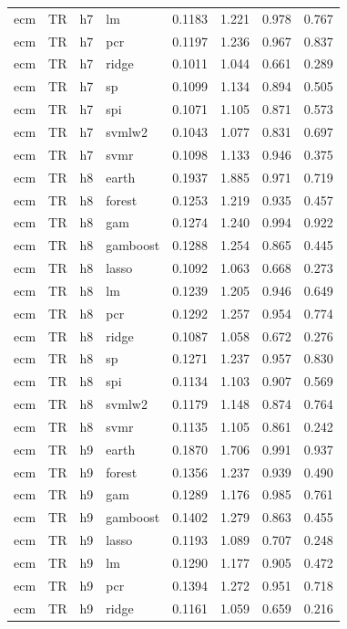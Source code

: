 \begin{ThreePartTable}
\begin{longtable}[t]{llclcccc}
ecm & TR & h7 & lm & 0.1183 & 1.221 & 0.978 & 0.767\\
ecm & TR & h7 & pcr & 0.1197 & 1.236 & 0.967 & 0.837\\
ecm & TR & h7 & ridge & 0.1011 & 1.044 & 0.661 & 0.289\\
ecm & TR & h7 & sp & 0.1099 & 1.134 & 0.894 & 0.505\\
ecm & TR & h7 & spi & 0.1071 & 1.105 & 0.871 & 0.573\\
ecm & TR & h7 & svmlw2 & 0.1043 & 1.077 & 0.831 & 0.697\\
ecm & TR & h7 & svmr & 0.1098 & 1.133 & 0.946 & 0.375\\
\addlinespace
ecm & TR & h8 & earth & 0.1937 & 1.885 & 0.971 & 0.719\\
ecm & TR & h8 & forest & 0.1253 & 1.219 & 0.935 & 0.457\\
ecm & TR & h8 & gam & 0.1274 & 1.240 & 0.994 & 0.922\\
ecm & TR & h8 & gamboost & 0.1288 & 1.254 & 0.865 & 0.445\\
ecm & TR & h8 & lasso & 0.1092 & 1.063 & 0.668 & 0.273\\
ecm & TR & h8 & lm & 0.1239 & 1.205 & 0.946 & 0.649\\
ecm & TR & h8 & pcr & 0.1292 & 1.257 & 0.954 & 0.774\\
ecm & TR & h8 & ridge & 0.1087 & 1.058 & 0.672 & 0.276\\
ecm & TR & h8 & sp & 0.1271 & 1.237 & 0.957 & 0.830\\
ecm & TR & h8 & spi & 0.1134 & 1.103 & 0.907 & 0.569\\
ecm & TR & h8 & svmlw2 & 0.1179 & 1.148 & 0.874 & 0.764\\
ecm & TR & h8 & svmr & 0.1135 & 1.105 & 0.861 & 0.242\\
\addlinespace
ecm & TR & h9 & earth & 0.1870 & 1.706 & 0.991 & 0.937\\
ecm & TR & h9 & forest & 0.1356 & 1.237 & 0.939 & 0.490\\
ecm & TR & h9 & gam & 0.1289 & 1.176 & 0.985 & 0.761\\
ecm & TR & h9 & gamboost & 0.1402 & 1.279 & 0.863 & 0.455\\
ecm & TR & h9 & lasso & 0.1193 & 1.089 & 0.707 & 0.248\\
ecm & TR & h9 & lm & 0.1290 & 1.177 & 0.905 & 0.472\\
ecm & TR & h9 & pcr & 0.1394 & 1.272 & 0.951 & 0.718\\
ecm & TR & h9 & ridge & 0.1161 & 1.059 & 0.659 & 0.216\\

\end{longtable}
\end{ThreePartTable}
